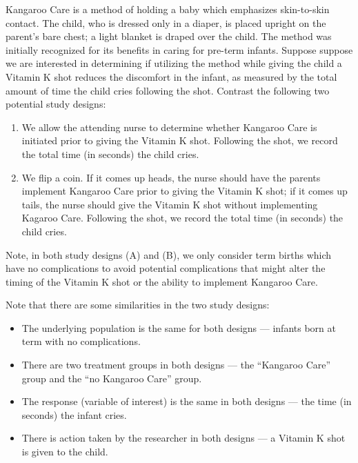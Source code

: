 \documentclass[]{book}
\providecommand{\tightlist}{%
  \setlength{\itemsep}{0pt}\setlength{\parskip}{0pt}}
\theoremstyle{definition}
\theoremstyle{definition}
\theoremstyle{definition}
\theoremstyle{remark}
\begin{document}
Kangaroo Care is a method of holding a baby which emphasizes
skin-to-skin contact. The child, who is dressed only in a diaper, is
placed upright on the parent's bare chest; a light blanket is draped
over the child. The method was initially recognized for its benefits in
caring for pre-term infants. Suppose suppose we are interested in
determining if utilizing the method while giving the child a Vitamin K
shot reduces the discomfort in the infant, as measured by the total
amount of time the child cries following the shot. Contrast the
following two potential study designs:

\begin{enumerate}
\def\labelenumi{(\Alph{enumi})}
\tightlist
\item
  We allow the attending nurse to determine whether Kangaroo Care is
  initiated prior to giving the Vitamin K shot. Following the shot, we
  record the total time (in seconds) the child cries.
\item
  We flip a coin. If it comes up heads, the nurse should have the
  parents implement Kangaroo Care prior to giving the Vitamin K shot; if
  it comes up tails, the nurse should give the Vitamin K shot without
  implementing Kagaroo Care. Following the shot, we record the total
  time (in seconds) the child cries.
\end{enumerate}

Note, in both study designs (A) and (B), we only consider term births
which have no complications to avoid potential complications that might
alter the timing of the Vitamin K shot or the ability to implement
Kangaroo Care.

Note that there are some similarities in the two study designs:

\begin{itemize}
\tightlist
\item
  The underlying population is the same for both designs --- infants
  born at term with no complications.
\item
  There are two treatment groups in both designs --- the ``Kangaroo
  Care'' group and the ``no Kangaroo Care'' group.
\item
  The response (variable of interest) is the same in both designs ---
  the time (in seconds) the infant cries.
\item
  There is action taken by the researcher in both designs --- a Vitamin
  K shot is given to the child.
\end{itemize}
\end{document}
